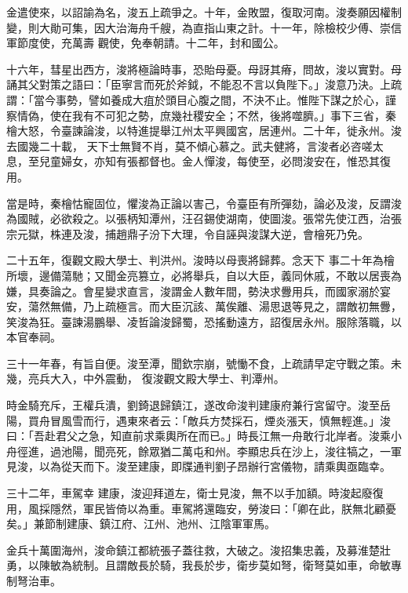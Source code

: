 \begin{pinyinscope}
 金遣使來，以詔諭為名，浚五上疏爭之。十年，金敗盟，復取河南。浚奏願因權制變，則大勛可集，因大治海舟千艘，為直指山東之計。十一年，除檢校少傅、崇信軍節度使，充萬壽
 觀使，免奉朝請。十二年，封和國公。



 十六年，彗星出西方，浚將極論時事，恐貽母憂。母訝其瘠，問故，浚以實對。母誦其父對策之語曰：「臣寧言而死於斧鉞，不能忍不言以負陛下。」浚意乃決。上疏謂：「當今事勢，譬如養成大疽於頭目心腹之間，不決不止。惟陛下謀之於心，謹察情偽，使在我有不可犯之勢，庶幾社稷安全；不然，後將噬臍。」事下三省，秦檜大怒，令臺諫論浚，以特進提舉江州太平興國宮，居連州。二十年，徙永州。浚去國幾二十載，
 天下士無賢不肖，莫不傾心慕之。武夫健將，言浚者必咨嗟太息，至兒童婦女，亦知有張都督也。金人憚浚，每使至，必問浚安在，惟恐其復用。



 當是時，秦檜怙寵固位，懼浚為正論以害己，令臺臣有所彈劾，論必及浚，反謂浚為國賊，必欲殺之。以張柄知潭州，汪召錫使湖南，使圖浚。張常先使江西，治張宗元獄，株連及浚，捕趙鼎子汾下大理，令自誣與浚謀大逆，會檜死乃免。



 二十五年，復觀文殿大學士、判洪州。浚時以母喪將歸葬。念天下
 事二十年為檜所壞，邊備蕩馳；又聞金亮篡立，必將舉兵，自以大臣，義同休戚，不敢以居喪為嫌，具奏論之。會星變求直言，浚謂金人數年間，勢決求釁用兵，而國家溺於宴安，蕩然無備，乃上疏極言。而大臣沉該、萬俟離、湯思退等見之，謂敵初無釁，笑浚為狂。臺諫湯鵬舉、凌哲論浚歸蜀，恐搖動遠方，詔復居永州。服除落職，以本官奉祠。



 三十一年春，有旨自便。浚至潭，聞欽宗崩，號慟不食，上疏請早定守戰之策。未幾，亮兵大入，中外震動，
 復浚觀文殿大學士、判潭州。



 時金騎充斥，王權兵潰，劉錡退歸鎮江，遂改命浚判建康府兼行宮留守。浚至岳陽，買舟冒風雪而行，遇東來者云：「敵兵方焚採石，煙炎漲天，慎無輕進。」浚曰：「吾赴君父之急，知直前求乘輿所在而已。」時長江無一舟敢行北岸者。浚乘小舟徑進，過池陽，聞亮死，餘眾猶二萬屯和州。李顯忠兵在沙上，浚往犒之，一軍見浚，以為從天而下。浚至建康，即牒通判劉子昂辦行宮儀物，請乘輿亟臨幸。



 三十二年，車駕幸
 建康，浚迎拜道左，衛士見浚，無不以手加額。時浚起廢復用，風採隱然，軍民皆倚以為重。車駕將還臨安，勞浚曰：「卿在此，朕無北顧憂矣。」兼節制建康、鎮江府、江州、池州、江陰軍軍馬。



 金兵十萬圍海州，浚命鎮江都統張子蓋往救，大破之。浚招集忠義，及募淮楚壯勇，以陳敏為統制。且謂敵長於騎，我長於步，衛步莫如弩，衛弩莫如車，命敏專制弩治車。




\end{pinyinscope}
